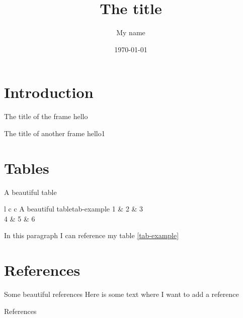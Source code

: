 \documentclass[aspectratio=169]{beamer}
\title{The title}
\author{My name}
\date{\today}
\begin{document}
\titleframe

\section{Introduction}

\begin{frame}{The title of the frame}
	hello
\end{frame}


\begin{frame}{The title of another frame}
	hello1
\end{frame}

\section{Tables}

\begin{frame}{A beautiful table}

	\begin{customtable}{l c c }{A beautiful table}{tab-example}
		1 & 2 & 3 \\
		4 & 5 & 6 \\
	\end{customtable}

	In this paragraph I can reference my table \ref{tab-example}

\end{frame}

\section{References}

\begin{frame}{Some beautiful references}
	Here is some text where I want to add a reference \cite{Dittrich19}
\end{frame}

\begin{frame}{References}
    
    
\end{frame}
\end{document}
